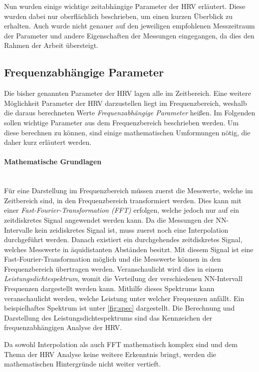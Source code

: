 Nun wurden einige wichtige zeitabhängige Parameter der HRV erläutert. Diese wurden dabei nur oberflächlich beschrieben, um einen kurzen Überblick zu erhalten. Auch wurde nicht genauer auf den jeweiligen empfohlenen Messzeitraum der Parameter und andere Eigenschaften der Messungen eingegangen, da dies den Rahmen der Arbeit übersteigt. 
 
\subsection{Frequenzabhängige Parameter}	

 Die bisher genannten Parameter der HRV lagen alle im Zeitbereich. Eine weitere Möglichkeit Parameter der HRV darzustellen liegt im Frequenzbereich, weshalb die daraus berechneten Werte \textit{Frequenzabhängige Parameter} heißen. Im Folgenden sollen wichtige Parameter aus dem Frequenzbereich beschrieben werden. Um diese berechnen zu können, sind einige mathematischen Umformungen nötig, die daher kurz erläutert werden.
 
 \paragraph{Mathematische Grundlagen}\mbox{} \\

 Für eine Darstellung im Frequenzbereich müssen zuerst die Messwerte, welche im Zeitbereich sind, in den Frequenzbereich transformiert werden. Dies kann mit einer \textit{Fast-Fourier-Transformation (FFT)} erfolgen, welche jedoch nur auf ein zeitdiskretes Signal angewendet werden kann. Da die Messungen der NN-Intervalle kein zeidiskretes Signal ist, muss zuerst noch eine Interpolation durchgeführt werden. Danach existiert ein durchgehendes zeitdiskretes Signal, welches Messwerte in äquidistanten Abständen besitzt. Mit diesem Signal ist eine Fast-Fourier-Transformation möglich und die Messwerte können in den Frequenzbereich übertragen werden. Veranschaulicht wird dies in einem \textit{Leistungsdichtespektrum}, womit die Verteilung der verschiedenen NN-Intervall Frequenzen dargestellt werden kann. Mithilfe dieses Spektrums kann veranschaulicht werden, welche Leistung unter welcher Frequenzen anfällt. Ein beispielhaftes Spektrum ist unter \ref{fig:spec} dargestellt. Die Berechnung und Darstellung des Leistungsdichtespektrums sind das Kennzeichen der frequenzabhängigen Analyse der HRV.\cite{freque}

 Da sowohl Interpolation als auch FFT mathematisch komplex sind und dem Thema der HRV Analyse keine weitere Erkenntnis bringt, werden die mathematischen Hintergründe nicht weiter vertieft.
 
